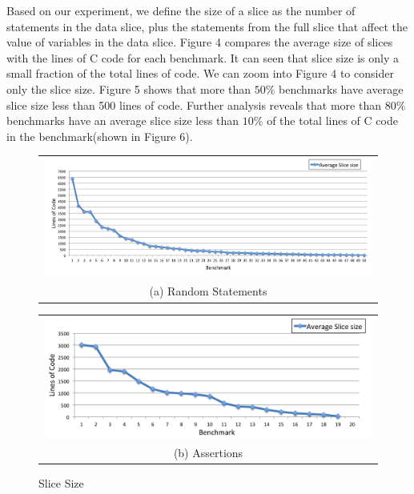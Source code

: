 \documentclass[12pt]{article}
\begin{document}
Based on our experiment, we define the size of a slice as the number of statements in the data slice, plus the statements from the full slice that affect the value of variables in the data slice. Figure 4 compares the average size of slices with the lines of C code for each benchmark. It can seen that slice size is only a small fraction of the total lines of code. We can zoom into Figure 4 to consider only the slice size. Figure 5 shows that  more than $50\%$ benchmarks have average slice size less than 500 lines of code. Further analysis reveals that more than $80\%$ benchmarks have an average slice size less than $10\%$ of the total lines of C code in the benchmark(shown in Figure 6).\\

 
 \begin{figure}[H]
  \centering
  \begin{tabular}{@{}c@{}}
   \includegraphics[width=5in]{slice-size-dec.png} \\[\abovecaptionskip]
    \small (a) Random Statements
  \end{tabular}

  \vspace{\floatsep}

  \begin{tabular}{@{}c@{}}
    \includegraphics[width=5in]{slice-size-dec-assert.png} \\[\abovecaptionskip]
    \small (b) Assertions
  \end{tabular}
  
  \caption{Slice Size}\label{slice size distribution}
\end{figure}
 
\end{document}
